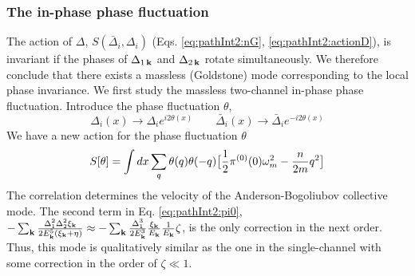 \documentclass[reprint,pra]{revtex4-1}
\begin{document}
\subsubsection{The in-phase phase fluctuation }
The action of $\Delta$, $S(\bar{\Delta}_i,\Delta_i)$ (Eqs. \ref{eq:pathInt2:nG}, \ref{eq:pathInt2:actionD}), is invariant if the phases of $\Delta_{1\,\mathbf{k}}$ and $\Delta_{2\,\mathbf{k}}$ rotate simultaneously. We therefore conclude that there exists a massless (Goldstone) mode corresponding to the local phase invariance. We first study the massless two-channel in-phase phase fluctuation.   Introduce the phase fluctuation $\theta$, 
\begin{equation*}
\Delta_{i}(x)\rightarrow{}\Delta_{i}e^{i2\theta(x)}\qquad{}
\bar{\Delta}_{i}(x)\rightarrow{}\bar{\Delta}_{i}e^{-i2\theta(x)}
\end{equation*}
We have a new action for the phase fluctuation $\theta$
\begin{equation}
S[\theta]=\int{dx}\sum_{q}\theta(q)\theta(-q)\big[\frac{1}{2}\pi^{(0)}(0)\omega_m^2-\frac{n}{2m}q^2\big]
\end{equation}
The correlation determines the velocity of the Anderson-Bogoliubov collective mode.  The second term in Eq. \eqref{eq:pathInt2:pi0}, $-\sum_{\mathbf{k}}\frac{\Delta_{1}^{2}\Delta_{2}^{2}\xi_{\mathbf{k}}}{2E_{\mathbf{k}}^{5}(\xi_{\mathbf{k}}+\eta)}\approx-\sum_{\mathbf{k}}\frac{\Delta_{1}^{3}}{2E_{\mathbf{k}}^{3}}\frac{\xi_{\mathbf{k}}}{E_{\mathbf{k}}}\frac{1}{E_{\mathbf{k}}}\zeta$, is the only correction in the next order.  Thus, this mode   is qualitatively similar as  the one in the single-channel with some correction in the order of $\zeta\ll1$.
\end{document}
